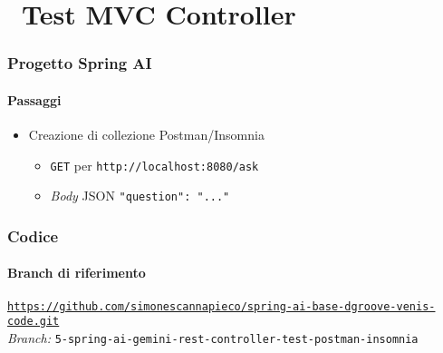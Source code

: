 \section{\faWrench\ Test MVC Controller} %
\label{sec:spring-ai-gemini-rest-controller-test-postman-insomnia}
%
\begin{frame}[t,fragile] \frametitle{Progetto Spring AI}
    \framesubtitle{Passaggi}
	\begin{itemize}[leftmargin=10pt,align=right]
		\item[\alertedcircled{1}] Creazione di collezione Postman/Insomnia
        \begin{itemize}[leftmargin=10pt,align=right]
		    \item[\alert{\faArrowCircleRight}] \texttt{GET} per \texttt{http://localhost:8080/ask}
		    \item[\alert{\faArrowCircleRight}] \textit{Body} JSON \texttt{"question": "..."}
		\end{itemize}
	\end{itemize}        
\end{frame}
%
\begin{frame}[fragile] \frametitle{Codice}
    \framesubtitle{Branch di riferimento}
	\begin{center}
		{\scriptsize \href{https://github.com/simonescannapieco/spring-ai-base-dgroove-venis-code.git}{\texttt{https://github.com/simonescannapieco/spring-ai-base-dgroove-venis-code.git}}}\\
		\textit{Branch:} \alert{\texttt{5-spring-ai-gemini-rest-controller-test-postman-insomnia}}
	\end{center}
\end{frame}